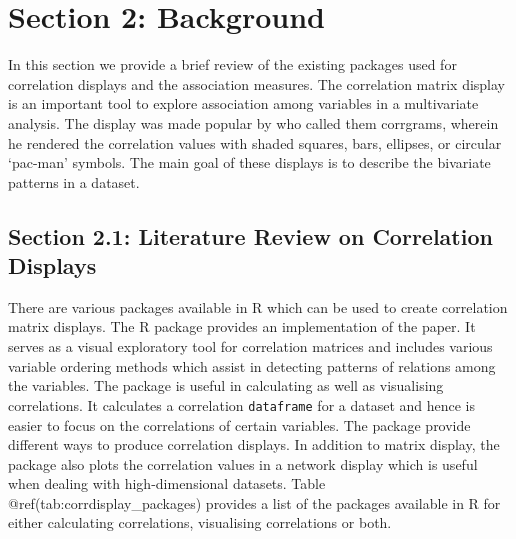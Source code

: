 \hypertarget{section-2-background}{%
\section{Section 2: Background}\label{section-2-background}}

In this section we provide a brief review of the existing packages used
for correlation displays and the association measures. The correlation
matrix display is an important tool to explore association among
variables in a multivariate analysis. The display was made popular by
\citet{friendly2002corrgrams} who called them corrgrams, wherein he
rendered the correlation values with shaded squares, bars, ellipses, or
circular `pac-man' symbols. The main goal of these displays is to
describe the bivariate patterns in a dataset.

\hypertarget{section-2.1-literature-review-on-correlation-displays}{%
\subsection{Section 2.1: Literature Review on Correlation
Displays}\label{section-2.1-literature-review-on-correlation-displays}}

There are various packages available in R which can be used to create
correlation matrix displays. The R package 
\citep{corrplot2021} provides an implementation of the
\citet{friendly2002corrgrams} paper. It serves as a visual exploratory
tool for correlation matrices and includes various variable ordering
methods which assist in detecting patterns of relations among the
variables. The package  \citep{corrr2020} is useful in
calculating as well as visualising correlations. It calculates a
correlation \texttt{dataframe} for a dataset and hence is easier to
focus on the correlations of certain variables. The package provide
different ways to produce correlation displays. In addition to matrix
display, the package also plots the correlation values in a network
display which is useful when dealing with high-dimensional datasets.
Table @ref(tab:corrdisplay\_packages) provides a list of the packages
available in R for either calculating correlations, visualising
correlations or both.

